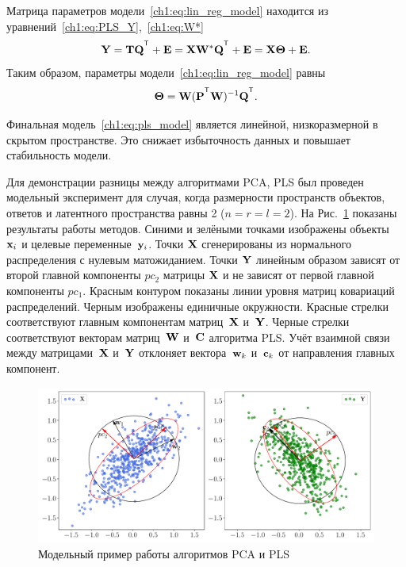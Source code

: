 Матрица параметров модели~\ref{ch1:eq:lin_reg_model} находится из уравнений~\eqref{ch1:eq:PLS_Y},~\eqref{ch1:eq:W*}
\begin{equation*}
	\bY = \bT \bQ^{\T} + \bE = \bX \bW^* \bQ^{\T} + \bE = \bX \bTheta + \bE.
	\label{ch1:eq:pls_model}
\end{equation*}
Таким образом, параметры модели~\eqref{ch1:eq:lin_reg_model} равны
\begin{equation}
	\bTheta = \bW (\bP^{\T} \bW)^{-1} \bQ^{\T}.
	\label{ch1:eq:linear_regression_model_parameters}
\end{equation}

Финальная модель~\eqref{ch1:eq:pls_model} является линейной, низкоразмерной в скрытом пространстве. 
Это снижает избыточность данных и повышает стабильность модели.

Для демонстрации разницы между алгоритмами PCA, PLS был проведен модельный эксперимент для случая, когда размерности пространств объектов, ответов и латентного пространства равны 2 ($n = r = l = 2$).
На Рис.~\ref{ch1:fig:pls_toy_example} показаны результаты работы методов. 
Синими и зелёными точками изображены объекты~$\mathbf{x}_i$ и целевые переменные~$\mathbf{y}_i$. 
Точки $\mathbf{X}$ сгенерированы из нормального распределения с нулевым матожиданием. 
Точки $\mathbf{Y}$ линейным образом зависят от второй  главной компоненты $pc_2$ матрицы $\mathbf{X}$ и не зависят от первой главной компоненты $pc_1$.
Красным контуром показаны линии уровня матриц ковариаций распределений. 
Черным изображены единичные окружности. 
Красные стрелки соответствуют главным компонентам матриц~$\mathbf{X}$ и~$\mathbf{Y}$. 
Черные стрелки соответствуют векторам матриц~$\mathbf{W}$ и~$\mathbf{C}$ алгоритма PLS. 
Учёт взаимной связи между матрицами~$\mathbf{X}$ и~$\mathbf{Y}$ отклоняет вектора~$\mathbf{w}_k$ и~$\mathbf{c}_k$ от направления главных компонент. 
\begin{figure}[h]
	\centering
	\includegraphics[width=\linewidth]{figs/ch1/pls_toy_example}
	\caption{Модельный пример работы алгоритмов PCA и PLS}
	\label{ch1:fig:pls_toy_example}
\end{figure}

